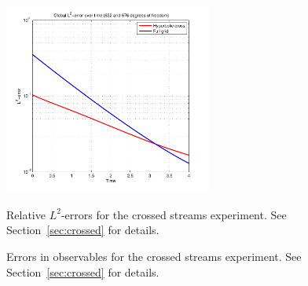 \begin{figure}
{        \includegraphics[width=6.8cm]{figs/hcboltz/hc1-l2-time}
        \label{fig:hc1:l2:time}
    }
    \caption{Relative $L^2$-errors for the crossed streams experiment. See Section~\vref{sec:crossed} for
    details.}
    \label{fig:hc1:l2}
\end{figure}

\begin{figure}
    \centering
    \caption{Errors in observables for the crossed streams experiment. See Section~\vref{sec:crossed} for
    details.}
    \label{fig:hc1:obs}
\end{figure}

